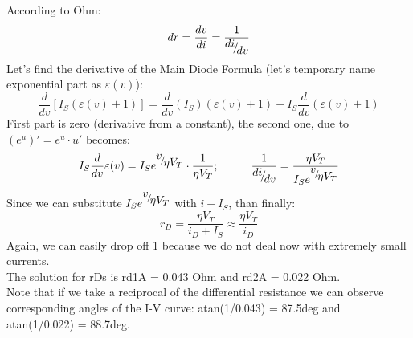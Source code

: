 \documentclass [12pt] {article}
\begin{document}
According to Ohm:\\
\[
  dr = \frac {dv}{di} = \frac {1}{\raise0.7ex \hbox{$di$} \! / \!
                                  \lower0.7ex \hbox{$dv$}}
\]
Let's find the derivative of the Main Diode Formula (let's temporary name exponential
 part as $\varepsilon(v)$):
\[
  \frac {d}{dv} \left[ I_S(\varepsilon(v)+1) \right] =
  \frac {d}{dv} (I_S)(\varepsilon(v)+1) + I_S \frac {d}{dv} (\varepsilon(v)+1)
\]
First part is zero (derivative from a constant), the second one, due to
 $(e^u)'=e^u \cdot u'$ becomes:
\[
  I_S \frac {d}{dv} \varepsilon(v) =
  I_S e^{\raise0.7ex \hbox{$v$} \! / \! \lower0.7ex \hbox{$\eta V_T$}} \cdot \frac {1}{\eta V_T}; \hspace{1cm}
  \frac {1}{\raise0.7ex \hbox{$di$} \! / \! \lower0.7ex \hbox{$dv$}} =
  \frac {\eta V_T}{I_S e^{ \raise0.7ex \hbox{$v$} \! / \! \lower0.7ex \hbox{$\eta V_T$} }  }
\]
Since we can substitute $I_S e^{ \raise0.7ex \hbox{$v$} \! / \! \lower0.7ex \hbox{$\eta V_T$} }$
 with $i + I_S$, than finally:
\[
  r_D = \frac {\eta V_T}{i_D + I_S} \approx \frac {\eta V_T}{i_D}
\]
Again, we can easily drop off 1 because we do not deal now with extremely small currents.\\
The solution for rDs is rd1A = 0.043 Ohm and rd2A = 0.022 Ohm.\\
Note that if we take a reciprocal of the differential resistance we can observe corresponding angles of the I-V curve: atan(1/0.043) = 87.5deg and atan(1/0.022) = 88.7deg.
\end{document}
